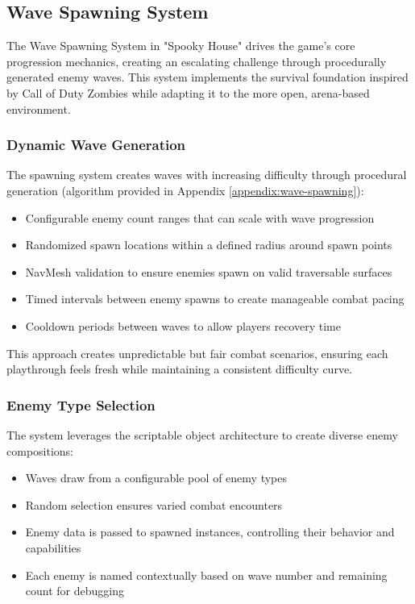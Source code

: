 \documentclass{article}
\begin{document}
    \subsection{Wave Spawning System}
    The Wave Spawning System in "Spooky House" drives the game's core progression mechanics, creating an escalating challenge through procedurally generated enemy waves. This system implements the survival foundation inspired by Call of Duty Zombies while adapting it to the more open, arena-based environment.

    \subsubsection{Dynamic Wave Generation}
    The spawning system creates waves with increasing difficulty through procedural generation (algorithm provided in Appendix \ref{appendix:wave-spawning}):

    \begin{itemize}
        \item Configurable enemy count ranges that can scale with wave progression
        \item Randomized spawn locations within a defined radius around spawn points
        \item NavMesh validation to ensure enemies spawn on valid traversable surfaces
        \item Timed intervals between enemy spawns to create manageable combat pacing
        \item Cooldown periods between waves to allow players recovery time
    \end{itemize}

    This approach creates unpredictable but fair combat scenarios, ensuring each playthrough feels fresh while maintaining a consistent difficulty curve.

    \subsubsection{Enemy Type Selection}
    The system leverages the scriptable object architecture to create diverse enemy compositions:

    \begin{itemize}
        \item Waves draw from a configurable pool of enemy types
        \item Random selection ensures varied combat encounters
        \item Enemy data is passed to spawned instances, controlling their behavior and capabilities
        \item Each enemy is named contextually based on wave number and remaining count for debugging
    \end{itemize}
\end{document}
